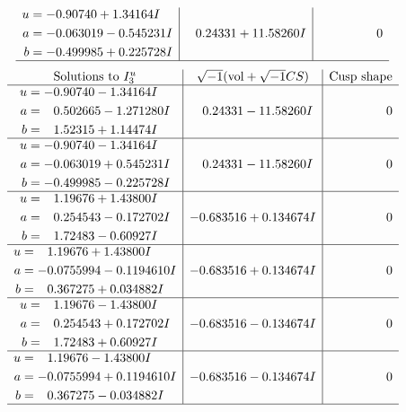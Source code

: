 \documentclass[1p]{elsarticle_modified}
\theoremstyle{definition}
\newcommand{\I}{\sqrt{-1}}
\begin{document}
$$\begin{array}{c|c|c}
\begin{aligned}
u &= -0.90740 + 1.34164 I \\
a &= -0.063019 - 0.545231 I \\
b &= -0.499985 + 0.225728 I\end{aligned}
 & \phantom{-}0.24331 + 11.58260 I & \phantom{-0.000000 } 0\\
 \hline 
 \end{array}$$\newpage$$\begin{array}{c|c|c}  
\text{Solutions to }I^u_{3}& \I (\text{vol} + \sqrt{-1}CS) & \text{Cusp shape}\\
 \hline 
\begin{aligned}
u &= -0.90740 - 1.34164 I \\
a &= \phantom{-}0.502665 - 1.271280 I \\
b &= \phantom{-}1.52315 + 1.14474 I\end{aligned}
 & \phantom{-}0.24331 - 11.58260 I & \phantom{-0.000000 } 0 \\ \hline\begin{aligned}
u &= -0.90740 - 1.34164 I \\
a &= -0.063019 + 0.545231 I \\
b &= -0.499985 - 0.225728 I\end{aligned}
 & \phantom{-}0.24331 - 11.58260 I & \phantom{-0.000000 } 0 \\ \hline\begin{aligned}
u &= \phantom{-}1.19676 + 1.43800 I \\
a &= \phantom{-}0.254543 - 0.172702 I \\
b &= \phantom{-}1.72483 - 0.60927 I\end{aligned}
 & -0.683516 + 0.134674 I & \phantom{-0.000000 } 0 \\ \hline\begin{aligned}
u &= \phantom{-}1.19676 + 1.43800 I \\
a &= -0.0755994 - 0.1194610 I \\
b &= \phantom{-}0.367275 + 0.034882 I\end{aligned}
 & -0.683516 + 0.134674 I & \phantom{-0.000000 } 0 \\ \hline\begin{aligned}
u &= \phantom{-}1.19676 - 1.43800 I \\
a &= \phantom{-}0.254543 + 0.172702 I \\
b &= \phantom{-}1.72483 + 0.60927 I\end{aligned}
 & -0.683516 - 0.134674 I & \phantom{-0.000000 } 0 \\ \hline\begin{aligned}
u &= \phantom{-}1.19676 - 1.43800 I \\
a &= -0.0755994 + 0.1194610 I \\
b &= \phantom{-}0.367275 - 0.034882 I\end{aligned}
 & -0.683516 - 0.134674 I & \phantom{-0.000000 } 0\\
 \hline 
 \end{array}$$\newpage\newpage\renewcommand{\arraystretch}{1}
\end{document}
